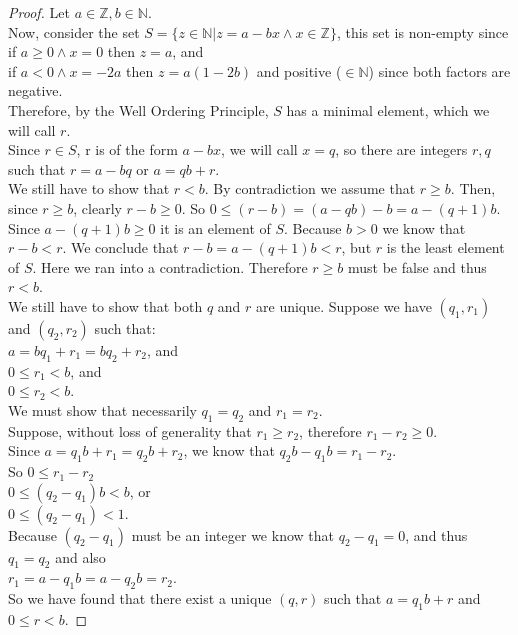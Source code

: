 \begin{proof}
Let $a \in \mathbb{Z}, b \in \mathbb{N}.$ \\
Now, consider the set $S=\{z \in \mathbb{N} | z= a - bx \land x \in \mathbb{Z} \}$, this set is non-empty since\\
\hspace*{0.5 cm}if $a \geq 0 \land x=0$ then $z=a$, and\\
\hspace*{0.5 cm}if $a < 0 \land x=-2a$ then $z=a(1-2b)$ and positive ($\in \mathbb{N}$) since both factors are negative.\\
Therefore, by the Well Ordering Principle, $S$ has a minimal element, which we will call $r$.\\
Since $r \in S$, r is of the form $a-bx$, we will call $x=q$, so there are integers $r,q$ such that $r=a-bq$ or $a=qb+r$.\\
\newline
We still have to show that $r < b$. By contradiction we assume that $r \geq b$. Then, since $r \geq b$, clearly $r-b \geq 0$.
So $0 \leq (r-b) = (a-qb)-b=a-(q+1)b$. Since $a-(q+1)b \geq 0$ it is an element of $S$. Because $b>0$ we know that $r-b<r$.
We conclude that $r-b=a-(q+1)b < r$, but $r$ is the least element of $S$. Here we ran into a contradiction. Therefore
$r \geq b$ must be false and thus $r < b$.\\
\newline
We still have to show that both $q$ and $r$ are unique. Suppose we have $(q_1,r_1)$ and $(q_2,r_2)$ such that:\\
\hspace*{0.5 cm}$a = bq_1+r_1 = bq_2+r_2$, and\\
\hspace*{0.5 cm}$0 \le r_1 < b$, and\\
\hspace*{0.5 cm}$0 \le r_2 < b$.\\
We must show that necessarily $q_1=q_2$ and $r_1=r_2$.\\
Suppose, without loss of generality that $r_1 \geq r_2$, therefore $r_1-r_2 \geq 0$.\\
Since $a=q_1b+r_1=q_2b+r_2$, we know that $q_2b-q_1b=r_1-r_2$.\\
So
\hspace*{0.5 cm}$0 \leq r_1 -r_2$ \\
\hspace*{0.5 cm}$0 \leq (q_2 -q_1)b < b$, or \\
\hspace*{0.5 cm}$0 \leq (q_2 -q_1) < 1$.\\
Because $(q_2-q_1)$ must be an integer we know that $q_2-q_1=0$, and thus $q_1=q_2$ and also\\
$r_1=a-q_1 b= a - q_2 b = r_2$.\\
\newline
So we have found that there exist a unique $(q,r)$ such that $a=q_1 b + r$ and $0 \leq r < b$. 
\end{proof}